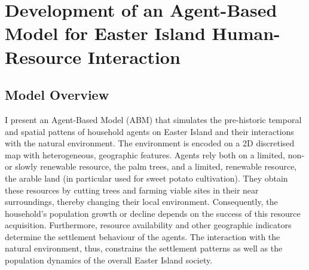 \chapter{Development of an Agent-Based Model for Easter Island Human-Resource Interaction}\label{chapter:Methods}

\section{Model Overview}
I present an Agent-Based Model (ABM) that simulates the pre-historic temporal and spatial pattens of household agents on Easter Island and their interactions with the natural environment. 
The environment is encoded on a 2D discretised map with heterogeneous, geographic features.
Agents rely both on a limited, non- or slowly renewable resource, the palm trees, and a limited, renewable resource, the arable land (in particular used for sweet potato cultivation). 
They obtain these resources by cutting trees and farming viable sites in their near surroundings, thereby changing their local environment.
Consequently, the household's population growth or decline depends on the success of this resource acquisition. 
Furthermore, resource availability and other geographic indicators determine the settlement behaviour of the agents.
The interaction with the natural environment, thus, constrains the settlement patterns as well as the population dynamics of the overall Easter Island society.

